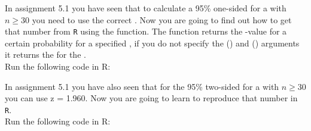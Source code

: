 \setcounter{chapter}{5}
\setcounter{section}{2}
\setcounter{question}{0}



In assignment 5.1 you have seen that to calculate a 95\% one-sided  for a  with $n \geq 30$ you need to use the correct . Now you are going to find out how to get that number from \texttt{R} using the  function. The  function returns the -value for a certain probability for a specified , if you do not specify the  () and  () arguments it returns the  for the . \\

Run the following code in R: \\




In assignment 5.1 you have also seen that for the 95\% two-sided  for a  with $n \geq 30$ you can use z = 1.960. Now you are going to learn to reproduce that number in \texttt{R}. \\

Run the following code in R: \\



\twolineanswerbox

\clearpage %

